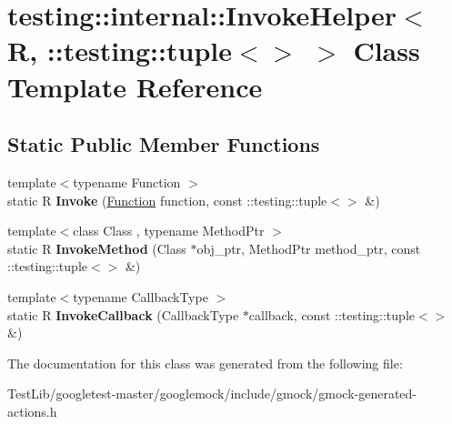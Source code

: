 \hypertarget{classtesting_1_1internal_1_1InvokeHelper_3_01R_00_01_1_1testing_1_1tuple_3_4_01_4}{}\section{testing\+:\+:internal\+:\+:Invoke\+Helper$<$ R, \+:\+:testing\+:\+:tuple$<$$>$ $>$ Class Template Reference}
\label{classtesting_1_1internal_1_1InvokeHelper_3_01R_00_01_1_1testing_1_1tuple_3_4_01_4}
\subsection*{Static Public Member Functions}
\begin{DoxyCompactItemize}
\item 
\mbox{\label{classtesting_1_1internal_1_1InvokeHelper_3_01R_00_01_1_1testing_1_1tuple_3_4_01_4_a55e6218235e69a896d88a3076a2c6150}} 
{\footnotesize template$<$typename Function $>$ }\\static R {\bfseries Invoke} (\hyperlink{structtesting_1_1internal_1_1Function}{Function} function, const \+::testing\+::tuple$<$$>$ \&)
\item 
\mbox{\label{classtesting_1_1internal_1_1InvokeHelper_3_01R_00_01_1_1testing_1_1tuple_3_4_01_4_a0368e26cbc1bcb12abbfb802f8294fa0}} 
{\footnotesize template$<$class Class , typename Method\+Ptr $>$ }\\static R {\bfseries Invoke\+Method} (Class $\ast$obj\+\_\+ptr, Method\+Ptr method\+\_\+ptr, const \+::testing\+::tuple$<$$>$ \&)
\item 
\mbox{\label{classtesting_1_1internal_1_1InvokeHelper_3_01R_00_01_1_1testing_1_1tuple_3_4_01_4_a9d81d455ebad0e8bf02a7d04c07ccb20}} 
{\footnotesize template$<$typename Callback\+Type $>$ }\\static R {\bfseries Invoke\+Callback} (Callback\+Type $\ast$callback, const \+::testing\+::tuple$<$$>$ \&)
\end{DoxyCompactItemize}


The documentation for this class was generated from the following file\+:\begin{DoxyCompactItemize}
\item 
Test\+Lib/googletest-\/master/googlemock/include/gmock/gmock-\/generated-\/actions.\+h\end{DoxyCompactItemize}
